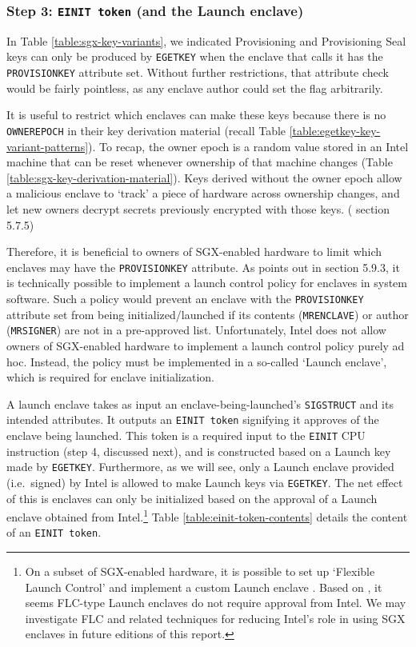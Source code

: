 \subsubsection{Step 3: {\tt EINIT token} (and the Launch enclave)}

In Table \ref{table:sgx-key-variants}, we indicated Provisioning and Provisioning Seal keys can only be produced by {\tt EGETKEY} when the enclave that calls it has the {\tt PROVISIONKEY} attribute set. Without further restrictions, that attribute check would be fairly pointless, as any enclave author could set the flag arbitrarily.

It is useful to restrict which enclaves can make these keys because there is no {\tt OWNEREPOCH} in their key derivation material (recall Table \ref{table:egetkey-key-variant-patterns}). To recap, the owner epoch is a random value stored in an Intel machine that can be reset whenever ownership of that machine changes (Table \ref{table:sgx-key-derivation-material}). Keys derived without the owner epoch allow a malicious enclave to `track' a piece of hardware across ownership changes, and let new owners decrypt secrets previously encrypted with those keys. (\cite{intel-sgx-explained-advanced} section 5.7.5)

Therefore, it is beneficial to owners of SGX-enabled hardware to limit which enclaves may have the {\tt PROVISIONKEY} attribute. As \cite{intel-sgx-explained-advanced} points out in section 5.9.3, it is technically possible to implement a launch control policy for enclaves in system software. Such a policy would prevent an enclave with the {\tt PROVISIONKEY} attribute set from being initialized/launched if its contents ({\tt MRENCLAVE}) or author ({\tt MRSIGNER}) are not in a pre-approved list. Unfortunately, Intel does not allow owners of SGX-enabled hardware to implement a launch control policy purely ad hoc. Instead, the policy must be implemented in a so-called `Launch enclave', which is required for enclave initialization.

A launch enclave takes as input an enclave-being-launched's {\tt SIGSTRUCT} and its intended attributes. It outputs an {\tt EINIT token} signifying it approves of the enclave being launched. This token is a required input to the {\tt EINIT} CPU instruction (step 4, discussed next), and is constructed based on a Launch key made by {\tt EGETKEY}. Furthermore, as we will see, only a Launch enclave provided (i.e.\ signed) by Intel is allowed to make Launch keys via {\tt EGETKEY}. The net effect of this is enclaves can only be initialized based on the approval of a Launch enclave obtained from Intel.\footnote{On a subset of SGX-enabled hardware, it is possible to set up `Flexible Launch Control' \cite{sgx-flexible-launch-control-update} and implement a custom Launch enclave \cite{sgx-reference-launch-enclave}. Based on \cite{sgx-reference-launch-enclave}, it seems FLC-type Launch enclaves do not require approval from Intel. We may investigate FLC and related techniques \cite{sgx-supporting-third-party-attestation} for reducing Intel's role in using SGX enclaves in future editions of this report.} Table \ref{table:einit-token-contents} details the content of an {\tt EINIT token}.

